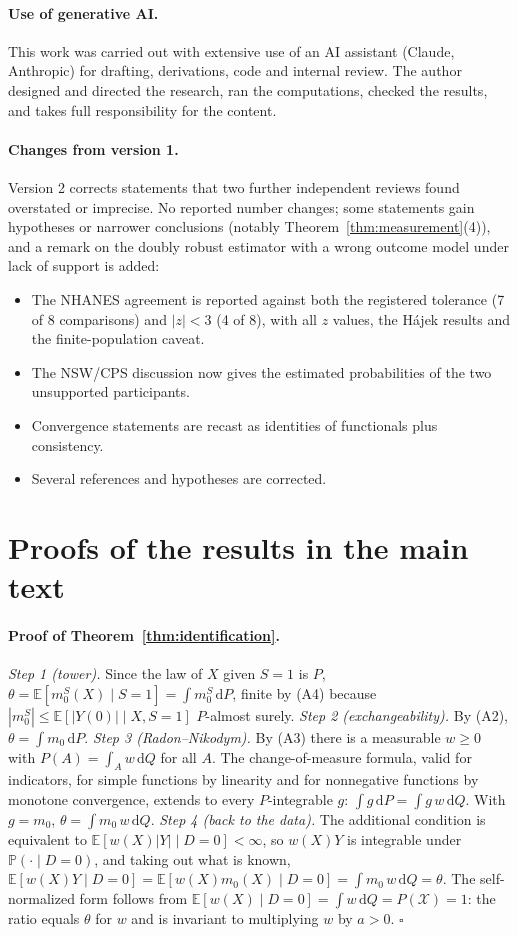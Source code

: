 \documentclass[twoside,11pt]{article}
\newcommand{\E}{\mathbb{E}}
\newcommand{\PP}{\mathbb{P}}
\newcommand{\X}{\mathcal{X}}
\newcommand{\dd}{\,\mathrm{d}}
\theoremstyle{plain}
\theoremstyle{definition}
\begin{document}
\paragraph{Use of generative AI.} This work was carried out with extensive use of an AI assistant (Claude, Anthropic) for drafting, derivations, code and internal review. The author designed and directed the research, ran the computations, checked the results, and takes full responsibility for the content.

\paragraph{Changes from version 1.} Version 2 corrects statements that two further independent reviews found overstated or imprecise. No reported number changes; some statements gain hypotheses or narrower conclusions (notably Theorem~\ref{thm:measurement}(4)), and a remark on the doubly robust estimator with a wrong outcome model under lack of support is added:
\begin{itemize}
  \item The NHANES agreement is reported against both the registered tolerance (7 of 8 comparisons) and $|z|<3$ (4 of 8), with all $z$ values, the H\'ajek results and the finite-population caveat.
  \item The NSW/CPS discussion now gives the estimated probabilities of the two unsupported participants.
  \item Convergence statements are recast as identities of functionals plus consistency.
  \item Several references and hypotheses are corrected.
\end{itemize}

\newpage
\appendix
\section{Proofs of the results in the main text}\label{app:proofs}

\paragraph{Proof of Theorem~\ref{thm:identification}.}
\emph{Step 1 (tower).} Since the law of $X$ given $S=1$ is $P$, $\theta=\E[m_0^S(X)\mid S=1]=\int m_0^S\dd P$, finite by (A4) because $|m_0^S|\le\E[|Y(0)|\mid X,S=1]$ $P$-almost surely.
\emph{Step 2 (exchangeability).} By (A2), $\theta=\int m_0\dd P$.
\emph{Step 3 (Radon--Nikodym).} By (A3) there is a measurable $w\ge0$ with $P(A)=\int_A w\dd Q$ for all $A$. The change-of-measure formula, valid for indicators, for simple functions by linearity and for nonnegative functions by monotone convergence, extends to every $P$-integrable $g$: $\int g\dd P=\int g\,w\dd Q$. With $g=m_0$, $\theta=\int m_0\,w\dd Q$.
\emph{Step 4 (back to the data).} The additional condition is equivalent to $\E[w(X)|Y|\mid D=0]<\infty$, so $w(X)Y$ is integrable under $\PP(\cdot\mid D=0)$, and taking out what is known, $\E[w(X)Y\mid D=0]=\E[w(X)m_0(X)\mid D=0]=\int m_0\,w\dd Q=\theta$.
The self-normalized form follows from $\E[w(X)\mid D=0]=\int w\dd Q=P(\X)=1$: the ratio equals $\theta$ for $w$ and is invariant to multiplying $w$ by $a>0$.
\hfill$\square$
\end{document}
